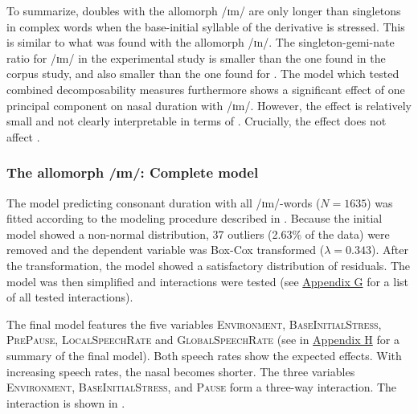 To summarize,  doubles with the allomorph /ɪm/  are only longer than singletons in complex words when the base-initial syllable of the derivative is stressed. This is similar to what was found with the allomorph /ɪn/. The singleton-gemi-nate ratio for /ɪm/  in the experimental study is smaller than the one found in the corpus study, and also smaller than the one found for . 
The model which tested combined decomposability measures furthermore shows a significant effect of one principal component on nasal duration with /ɪm/. However, the effect is relatively small and not clearly interpretable in terms of . Crucially, the effect does not affect .




\subsubsection{The allomorph /ɪm/: Complete model}

The model predicting consonant duration with all /ɪm/-words ($N=1635$) was fitted according to the modeling procedure described in .  Because the initial model showed a non-normal distribution,  37 outliers (2.63\% of the data) were removed and the dependent variable was Box-Cox transformed ($\lambda = 0.343$). 
After the transformation, the model showed a satisfactory distribution of residuals. The model was then simplified and interactions were tested (see \hyperref[Appendix G Summaries of tested interactions in experimental study]{Appendix G} for a list of all tested interactions). 

 
The final model features the five variables \textsc{Environment}, \textsc{BaseInitialStress}, \textsc{PrePause}, \textsc{LocalSpeechRate} and \textsc{GlobalSpeechRate} (see  in \hyperref[Appendix H: Model Summaries Experiment]{Appen\-dix H} for a summary of the final model). Both speech rates show the expected effects. With increasing speech rates, the nasal becomes shorter. The three variables \textsc{Environment}, \textsc{BaseInitialStress}, and \textsc{Pause} form a three-way interaction. The interaction is shown in .

